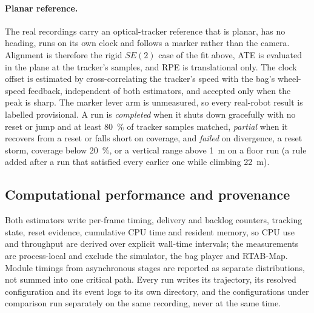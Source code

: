 \paragraph{Planar reference.} The real recordings carry an optical-tracker
reference that is planar, has no heading, runs on its own clock and follows a
marker rather than the camera. Alignment is therefore the rigid $SE(2)$ case
of the fit above, ATE is evaluated in the plane at the tracker's samples, and
RPE is translational only. The clock offset is estimated by cross-correlating
the tracker's speed with the bag's wheel-speed feedback, independent of both
estimators, and accepted only when the peak is sharp. The marker lever arm is
unmeasured, so every real-robot result is labelled provisional. A run is
\emph{completed} when it shuts down gracefully with no reset or jump and at
least \SI{80}{\percent} of tracker samples matched, \emph{partial} when it
recovers from a reset or falls short on coverage, and \emph{failed} on
divergence, a reset storm, coverage below \SI{20}{\percent}, or a vertical
range above \SI{1}{\metre} on a floor run (a rule added after a run that
satisfied every earlier one while climbing \SI{22}{\metre}).

\subsection{Computational performance and provenance}
\label{sec:collection-validity}
Both estimators write per-frame timing, delivery and backlog counters, tracking
state, reset evidence, cumulative CPU time and resident memory, so CPU use and
throughput are derived over explicit wall-time intervals; the measurements are
process-local and exclude the simulator, the bag player and RTAB-Map. Module
timings from asynchronous stages are reported as separate distributions, not
summed into one critical path. Every run writes its trajectory, its resolved
configuration and its event logs to its own directory, and the configurations
under comparison run separately on the same recording, never at the same time.
